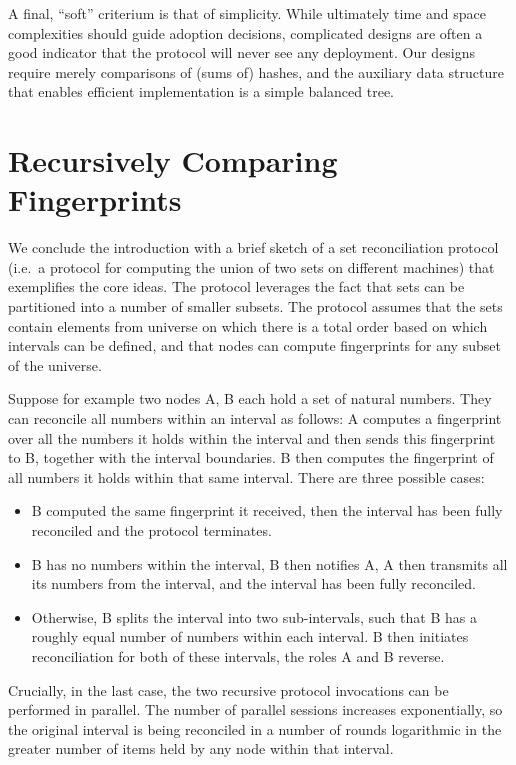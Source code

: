 A final, ``soft'' criterium is that of simplicity. While ultimately time
and space complexities should guide adoption decisions, complicated
designs are often a good indicator that the protocol will never see any
deployment. Our designs require merely comparisons of (sums of) hashes,
and the auxiliary data structure that enables efficient implementation
is a simple balanced tree.

\section{Recursively Comparing
Fingerprints}\label{recursively-comparing-fingerprints}

We conclude the introduction with a brief sketch of a set reconciliation
protocol (i.e.~a protocol for computing the union of two sets on
different machines) that exemplifies the core ideas. The protocol
leverages the fact that sets can be partitioned into a number of smaller
subsets. The protocol assumes that the sets contain elements from
universe on which there is a total order based on which intervals can be
defined, and that nodes can compute fingerprints for any subset of the
universe.

Suppose for example two nodes A, B each hold a set of natural numbers.
They can reconcile all numbers within an interval as follows: A computes
a fingerprint over all the numbers it holds within the interval and then sends this
fingerprint to B, together with the interval boundaries. B then computes
the fingerprint of all numbers it holds within that same interval. There
are three possible cases:

\begin{itemize}
\item
  B computed the same fingerprint it received, then the interval has
  been fully reconciled and the protocol terminates.
\item
  B has no numbers within the interval, B then notifies A, A then
  transmits all its numbers from the interval, and the interval has been
  fully reconciled.
\item
  Otherwise, B splits the interval into two sub-intervals, such that B
  has a roughly equal number of numbers within each interval. B then
  initiates reconciliation for both of these intervals, the roles A and
  B reverse.
\end{itemize}

Crucially, in the last case, the two recursive protocol invocations can
be performed in parallel. The number of parallel sessions increases
exponentially, so the original interval is being reconciled in a number
of rounds logarithmic in the greater number of items held by any node
within that interval.

